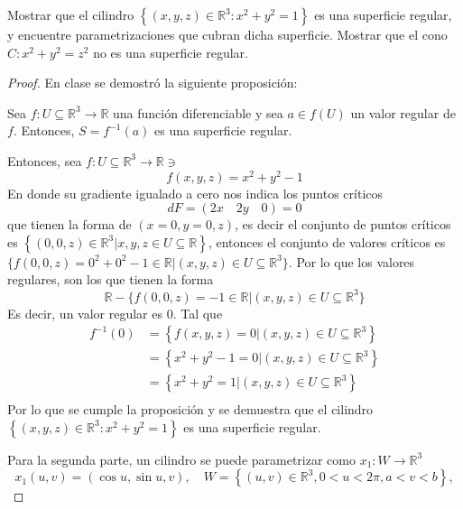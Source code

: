 





\begin{problema}
    Mostrar que el cilindro $\left\{(x, y, z) \in \mathbb{R}^3: x^2+y^2=1\right\}$ es una superficie regular, y encuentre parametrizaciones que cubran dicha superficie. Mostrar que el cono $C: x^2+y^2=z^2$ no es una superficie regular.
    \begin{proof}
        En clase se demostró la siguiente proposición: 
        \begin{cajita}
            \begin{prop}

                Sea $f: U \subseteq  \mathbb{R}^3 \to \mathbb{R}$ una función diferenciable y sea $a\in f(U)$
                un valor regular de $f$. Entonces, $S = f^{-1}(a)$ es una superficie regular.
                        \end{prop}
        \end{cajita}
        Entonces, sea $f: U\subseteq \mathbb{R}^3\to \mathbb{R}\ni$
        $$f(x,y,z)= x^2+y^2-1$$
        En donde su gradiente igualado a cero nos indica los puntos críticos
        $$dF =\left(2x\quad 2y \quad 0\right)=0$$
        que tienen la forma de $(x=0,y=0,z)$, es decir el conjunto de puntos críticos es $\left\{(0,0,z)\in \mathbb{R}^3| x,y,z\in U\subseteq\mathbb{R}\right\}$, entonces el conjunto de valores críticos es $\{f(0,0,z)=0^2+0^2-1\in \mathbb{R}|(x,y,z)\in U\subseteq\mathbb{R}^3\}$. Por lo que los valores regulares, son los que tienen la forma $$\mathbb{R}-\{f(0,0,z)=-1\in \mathbb{R}|(x,y,z)\in U\subseteq\mathbb{R}^3\}$$
        Es decir, un valor regular es $0$. Tal que 
        \begin{align*}
            f^{-1}(0) &=\left\{f(x,y,z)=0| (x,y,z)\in U\subseteq \mathbb{R}^3\right\}\\
            &= \left\{x^2+y^2-1=0| (x,y,z)\in U\subseteq \mathbb{R}^3\right\}\\
            &= \left\{x^2+y^2=1| (x,y,z)\in U\subseteq \mathbb{R}^3\right\}\\
        \end{align*}
        Por lo que se cumple la proposición y se demuestra que  el cilindro $\left\{(x, y, z) \in \mathbb{R}^3: x^2+y^2=1\right\}$ es una superficie regular.

        Para la segunda parte, un cilindro se puede parametrizar como $x_1:W\to \mathbb{R}^3$
        $$x_1(u,v)=\left(\cos u, \sin u, v\right),\quad W=\left\{(u,v)\in \mathbb{R}^3,0<u<2\pi,a<v<b\right\},$$
        

\end{proof}
\end{problema}
